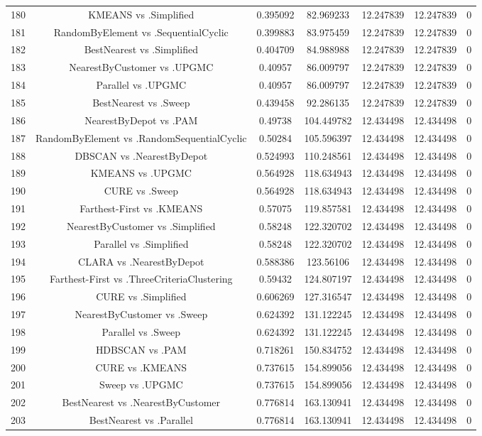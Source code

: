 \documentclass[a4paper,10pt]{article}
\begin{document}
\begin{landscape}
\begin{table}[!htp]
\begin{tabular}{ccccccc}
180&KMEANS vs .Simplified&0.395092&82.969233&12.247839&12.247839&0\\
181&RandomByElement vs .SequentialCyclic&0.399883&83.975459&12.247839&12.247839&0\\
182&BestNearest vs .Simplified&0.404709&84.988988&12.247839&12.247839&0\\
183&NearestByCustomer vs .UPGMC&0.40957&86.009797&12.247839&12.247839&0\\
184&Parallel vs .UPGMC&0.40957&86.009797&12.247839&12.247839&0\\
185&BestNearest vs .Sweep&0.439458&92.286135&12.247839&12.247839&0\\
186&NearestByDepot vs .PAM&0.49738&104.449782&12.434498&12.434498&0\\
187&RandomByElement vs .RandomSequentialCyclic&0.50284&105.596397&12.434498&12.434498&0\\
188&DBSCAN vs .NearestByDepot&0.524993&110.248561&12.434498&12.434498&0\\
189&KMEANS vs .UPGMC&0.564928&118.634943&12.434498&12.434498&0\\
190&CURE vs .Sweep&0.564928&118.634943&12.434498&12.434498&0\\
191&Farthest-First vs .KMEANS&0.57075&119.857581&12.434498&12.434498&0\\
192&NearestByCustomer vs .Simplified&0.58248&122.320702&12.434498&12.434498&0\\
193&Parallel vs .Simplified&0.58248&122.320702&12.434498&12.434498&0\\
194&CLARA vs .NearestByDepot&0.588386&123.56106&12.434498&12.434498&0\\
195&Farthest-First vs .ThreeCriteriaClustering&0.59432&124.807197&12.434498&12.434498&0\\
196&CURE vs .Simplified&0.606269&127.316547&12.434498&12.434498&0\\
197&NearestByCustomer vs .Sweep&0.624392&131.122245&12.434498&12.434498&0\\
198&Parallel vs .Sweep&0.624392&131.122245&12.434498&12.434498&0\\
199&HDBSCAN vs .PAM&0.718261&150.834752&12.434498&12.434498&0\\
200&CURE vs .KMEANS&0.737615&154.899056&12.434498&12.434498&0\\
201&Sweep vs .UPGMC&0.737615&154.899056&12.434498&12.434498&0\\
202&BestNearest vs .NearestByCustomer&0.776814&163.130941&12.434498&12.434498&0\\
203&BestNearest vs .Parallel&0.776814&163.130941&12.434498&12.434498&0\\

\end{tabular}
\end{table}
\end{landscape}
\end{document}
